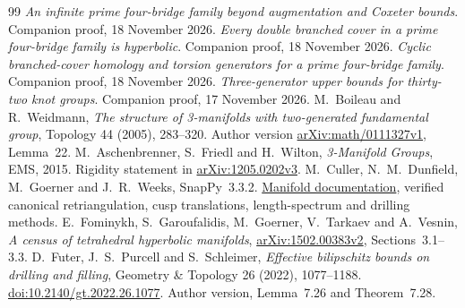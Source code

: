 \documentclass[11pt]{article}
\begin{document}
\begin{thebibliography}{99}
 \emph{An infinite prime four-bridge family beyond
augmentation and Coxeter bounds}. Companion proof, 18 November 2026.
 \emph{Every double branched cover in a prime
four-bridge family is hyperbolic}. Companion proof, 18 November 2026.
 \emph{Cyclic branched-cover homology and torsion
generators for a prime four-bridge family}. Companion proof,
18 November 2026.
 \emph{Three-generator upper bounds for thirty-two
knot groups}. Companion proof, 17 November 2026.
 M.~Boileau and R.~Weidmann, \emph{The structure of
3-manifolds with two-generated fundamental group}, Topology
44 (2005), 283--320. Author version \href{https://arxiv.org/abs/math/0111327}{arXiv:math/0111327v1}, Lemma~22.
 M.~Aschenbrenner, S.~Friedl and H.~Wilton,
\emph{3-Manifold Groups}, EMS, 2015. Rigidity statement in
\href{https://arxiv.org/abs/1205.0202v3}{arXiv:1205.0202v3}.
 M.~Culler, N.~M.~Dunfield, M.~Goerner and
J.~R.~Weeks, SnapPy~3.3.2. \href{https://snappy.computop.org/manifold.html}{Manifold documentation},
verified canonical retriangulation, cusp translations,
length-spectrum and drilling methods.
 E.~Fominykh, S.~Garoufalidis, M.~Goerner,
V.~Tarkaev and A.~Vesnin, \emph{A census of tetrahedral hyperbolic
manifolds}, \href{https://arxiv.org/abs/1502.00383v2}{arXiv:1502.00383v2}, Sections~3.1--3.3.
 D.~Futer, J.~S.~Purcell and S.~Schleimer,
\emph{Effective bilipschitz bounds on drilling and filling},
Geometry \& Topology 26 (2022), 1077--1188.
\href{https://doi.org/10.2140/gt.2022.26.1077}{doi:10.2140/gt.2022.26.1077}.
Author version, Lemma~7.26 and Theorem~7.28.
\end{thebibliography}
\end{document}
